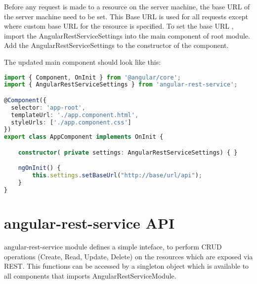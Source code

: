 \hspace{0.2in}Before any request  is made to a resource on the server machine, the base URL of the server machine need to be set.
This Base URL is used for all requests except where custom base URL for the resource is specified. To set the base URL , import the AngularRestServiceSettings into the main component of root module.  Add the AngularRestServiceSettings to the constructor of the component.

\hspace{0.2in}The updated main component should look like this:


\begin{lstlisting}[language=Typescript]
import { Component, OnInit } from '@angular/core';
import { AngularRestServiceSettings } from 'angular-rest-service';

@Component({
  selector: 'app-root',
  templateUrl: './app.component.html',
  styleUrls: ['./app.component.css']
})
export class AppComponent implements OnInit {

	constructor( private settings: AngularRestServiceSettings) { }

  	ngOnInit() {
		this.settings.setBaseUrl("http://base/url/api");
  	}
}
\end{lstlisting}



\section{angular-rest-service API}

\hspace{0.2in}angular-rest-service module defines a simple inteface, to perform CRUD operations (Create, Read, Update, Delete) on the resources which are exposed via REST. This functions can be accessed by a singleton object which is available to all components that imports AngularRestServiceModule. 
	
